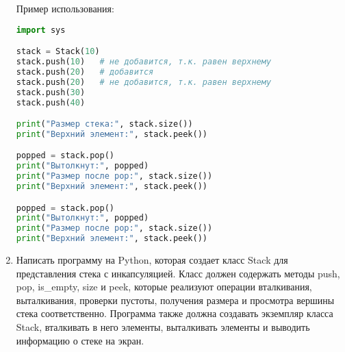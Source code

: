 \begin{enumerate}
Пример использования:
\begin{lstlisting}[language=Python]
import sys

stack = Stack(10)
stack.push(10)   # не добавится, т.к. равен верхнему
stack.push(20)   # добавится
stack.push(20)   # не добавится, т.к. равен верхнему
stack.push(30)
stack.push(40)

print("Размер стека:", stack.size())
print("Верхний элемент:", stack.peek())

popped = stack.pop()
print("Вытолкнут:", popped)
print("Размер после pop:", stack.size())
print("Верхний элемент:", stack.peek())

popped = stack.pop()
print("Вытолкнут:", popped)
print("Размер после pop:", stack.size())
print("Верхний элемент:", stack.peek())
\end{lstlisting}

\item Написать программу на Python, которая создает класс Stack для представления стека с инкапсуляцией. Класс должен содержать методы push, pop, is\_empty, size и peek, которые реализуют операции вталкивания, выталкивания, проверки пустоты, получения размера и просмотра вершины стека соответственно. Программа также должна создавать экземпляр класса Stack, вталкивать в него элементы, выталкивать элементы и выводить информацию о стеке на экран.


\end{enumerate}
